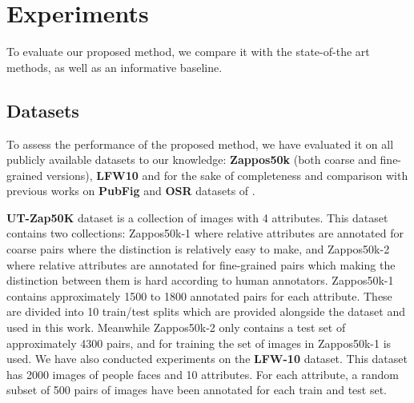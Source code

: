 

\section{Experiments}\label{sec.4}

To evaluate our proposed method, we compare it with the state-of-the art methods, as well as an informative baseline.

\subsection{Datasets}
To assess the performance of the proposed method, we have evaluated it on all publicly available datasets to our knowledge: \textbf{Zappos50k} \cite{Yu2014} (both coarse and fine-grained versions), \textbf{LFW10} \cite{Sandeep_2014_CVPR} and for the sake of completeness and comparison with previous works on \textbf{PubFig} and \textbf{OSR} datasets of \cite{parikh2011}.

\textbf{UT-Zap50K} \cite{Yu2014} dataset is a collection of images with 4 attributes. This dataset contains two collections: Zappos50k-1 where relative attributes are annotated for coarse pairs where the distinction is relatively easy to make, and Zappos50k-2 where relative attributes are annotated for fine-grained pairs which making the distinction between them is hard according to human annotators.
Zappos50k-1 contains approximately 1500 to 1800 annotated pairs for each attribute. These are divided into 10 train/test splits which are provided alongside the dataset and used in this work. Meanwhile Zappos50k-2 only contains a test set of approximately 4300 pairs, and for training the set of images in Zappos50k-1 is used.
We have also conducted experiments on the \textbf{LFW-10} \cite{Sandeep_2014_CVPR} dataset. This dataset has 2000 images of people faces and 10 attributes. For each attribute, a random subset of 500 pairs of images have been annotated for each train and test set.

